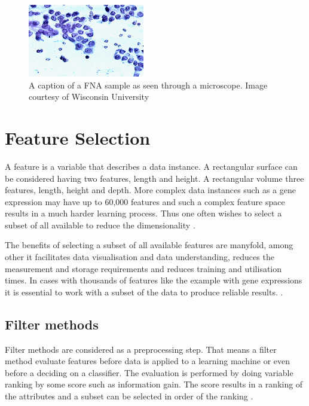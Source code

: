 \begin{figure}[ht!]
  \centering
  \includegraphics[]{images/fna_nuclei.png}
  \caption{A caption of a FNA sample as seen through a microscope. Image courtesy of Wisconsin University}
  \label{fig:fna_nuclei}
\end{figure}



\section{Feature Selection}

A feature is a variable that describes a data instance. A rectangular surface can be considered having two features, length and height. A rectangular volume three features, length, height and depth. More complex data instances such as a gene expression may have up to 60,000 features and such a complex feature space results in a much harder learning process. Thus one often wishes to select a subset of all available to reduce the dimensionality \parencite{guyon2003}.

The benefits of selecting a subset of all available features are manyfold, among other it facilitates data visualisation and data understanding, reduces the measurement and storage requirements and reduces training and utilisation times. In cases with thousands of features like the example with gene expressions it is essential to work with a subset of the data to produce reliable results. \parencite{guyon2003}.


\subsection{Filter methods}

Filter methods are considered as a preprocessing step. That means a filter method evaluate features before data is applied to a learning machine or even before a deciding on a classifier. The evaluation is performed by doing variable ranking by some score such as information gain. The score results in a ranking of the attributes and a subset can be selected in order of the ranking \parencite{guyon2003}.

